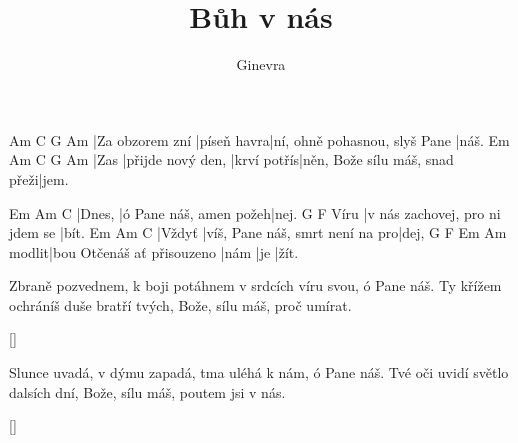 \documentclass{song}
\title{Bůh v nás}
\author{Ginevra}
\begin{document}
\strophe
Am              C           G                             Am
|Za obzorem zní |píseň havra|ní, ohně pohasnou, slyš Pane |náš.
Em   Am                C           G                              Am
|Zas |přijde nový den, |krví potřís|něn, Bože sílu máš, snad přeži|jem.
\endstrophe

Em     Am                     C
|Dnes, |ó Pane náš, amen požeh|nej.
     G                               F
Víru |v nás zachovej, pro ni jdem se |bít.
Em     Am                              C
|Vždyť |víš, Pane náš, smrt není na pro|dej,
      G                          F    Em  Am
modlit|bou Otčenáš ať přisouzeno |nám |je |žít.
\endstrophe

\strophe*
Zbraně pozvednem, k boji potáhnem v srdcích víru svou, ó Pane náš.
Ty křížem ochráníš duše bratří tvých, Bože, sílu máš, proč umírat.
\endstrophe

\ref{}

\strophe*
Slunce uvadá, v dýmu zapadá, tma uléhá k nám, ó Pane náš.
Tvé oči uvidí světlo dalsích dní, Bože, sílu máš, poutem jsi v nás.
\endstrophe

\ref{}
\end{document}
